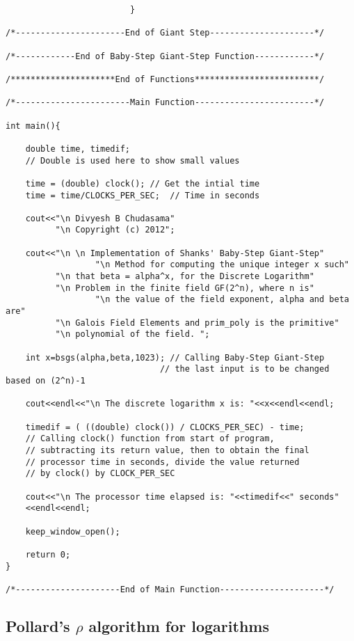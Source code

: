 \documentclass[iwp,first]{luthesis}
\begin{document}
\begin{verbatim}
                         }                        

/*----------------------End of Giant Step---------------------*/

/*------------End of Baby-Step Giant-Step Function------------*/

/*********************End of Functions*************************/

/*-----------------------Main Function------------------------*/

int main(){

    double time, timedif; 
    // Double is used here to show small values

    time = (double) clock(); // Get the intial time
    time = time/CLOCKS_PER_SEC;  // Time in seconds 
    
    cout<<"\n Divyesh B Chudasama"
          "\n Copyright (c) 2012";
          
    cout<<"\n \n Implementation of Shanks' Baby-Step Giant-Step" 
		          "\n Method for computing the unique integer x such" 
          "\n that beta = alpha^x, for the Discrete Logarithm" 
          "\n Problem in the finite field GF(2^n), where n is" 
		          "\n the value of the field exponent, alpha and beta are" 
          "\n Galois Field Elements and prim_poly is the primitive" 
          "\n polynomial of the field. ";

    int x=bsgs(alpha,beta,1023); // Calling Baby-Step Giant-Step
							   // the last input is to be changed based on (2^n)-1

    cout<<endl<<"\n The discrete logarithm x is: "<<x<<endl<<endl;
    
    timedif = ( ((double) clock()) / CLOCKS_PER_SEC) - time; 
    // Calling clock() function from start of program, 
    // subtracting its return value, then to obtain the final 
    // processor time in seconds, divide the value returned 
    // by clock() by CLOCK_PER_SEC
    
    cout<<"\n The processor time elapsed is: "<<timedif<<" seconds"
    <<endl<<endl;
    
    keep_window_open();
    
    return 0;
}       
    
/*---------------------End of Main Function---------------------*/    

\end{verbatim}





\subsection{Pollard's $\rho$ algorithm for logarithms}
\end{document}
